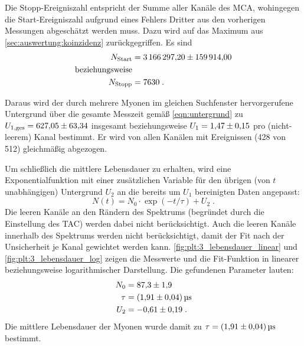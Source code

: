 Die Stopp-Ereigniszahl entspricht der Summe aller Kanäle des \ac{MCA}, %
wohingegen die Start-Ereigniszahl aufgrund eines Fehlers Dritter aus den vorherigen Messungen abgeschätzt werden muss.
Dazu wird auf das Maximum aus \autoref{sec:auswertung:koinzidenz} zurückgegriffen.
Es sind
\begin{align*}
    N_\text{Start} &= \num{3166297.20 \pm 159914.00} \\
    \text{beziehungsweise} \\
    N_\text{Stopp} &= \num{7630} \; .
\end{align*}

Daraus wird der durch mehrere Myonen im gleichen Suchfenster hervorgerufene Untergrund über die gesamte Messzeit
gemäß \autoref{eqn:untergrund} zu
$U_{1, \text{ges}} = \num{627.05 \pm 63.34}$ insgesamt
beziehungsweise
$U_1 = \num{1.47 \pm 0.15}$ pro (nicht-leerem) Kanal
bestimmt.
Er wird von allen Kanälen mit Ereignissen (\num{428} von \num{512}) gleichmäßig abgezogen.

Um schließlich die mittlere Lebensdauer zu erhalten,
wird eine Exponentialfunktion mit einer zusätzlichen Variable für den übrigen (von $t$ unabhängigen) Untergrund $U_2$
an die bereits um $U_1$ bereinigten Daten angepasst:
\begin{equation*}
    N(t) = N_0 \cdot \exp (-t / \tau) + U_2 \; .
\end{equation*}
Die leeren Kanäle an den Rändern des Spektrums (begründet durch die Einstellung des \ac{TAC}) werden dabei nicht berücksichtigt.
Auch die leeren Kanäle innerhalb des Spektrums werden nicht berücksichtigt,
damit der Fit nach der Unsicherheit je Kanal gewichtet werden kann.
\autoref{fig:plt:3_lebensdauer_linear} und \autoref{fig:plt:3_lebensdauer_log} zeigen die Messwerte und die Fit-Funktion
in linearer beziehungsweise logarithmischer Darstellung.
Die gefundenen Parameter lauten:
\begin{align*}
    N_0 &= \num{87.3 \pm 1.9} \\
    \tau &= \SI{1.91 \pm 0.04}{\micro\second} \\
    U_2 &= \num{-0.61 \pm 0.19} \; .
\end{align*}
Die mittlere Lebensdauer der Myonen wurde damit zu $\tau = \SI{1.91 \pm 0.04}{\micro\second}$ bestimmt.

